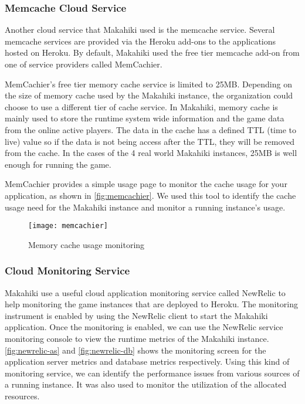 \subsubsection{Memcache Cloud Service}

Another cloud service that Makahiki used is the memcache service. Several memcache services are provided via the Heroku add-ons to the applications hosted on Heroku. By default, Makahiki used the free tier memcache add-on from one of service providers called MemCachier\cite{memcachier}. 

MemCachier's free tier memory cache service is limited to 25MB. Depending on the size of memory cache used by the Makahiki instance, the organization could choose to use a different tier of cache service. In Makahiki, memory cache is mainly used to store the runtime system wide information and the game data from the online active players. The data in the cache has a defined TTL (time to live) value so if the data is not being access after the TTL, they will be removed from the cache. In the cases of the 4 real world Makahiki instances, 25MB is well enough for running the game.

MemCachier provides a simple usage page to monitor the cache usage for your application, as shown in \autoref{fig:memcachier}. We used this tool to identify the cache usage need for the Makahiki instance and monitor a running instance's usage.

\begin{figure}[ht!]
  \center
  \texttt{[image: memcachier]}
  \caption{Memory cache usage monitoring}
  \label{fig:memcachier}
\end{figure}

\subsubsection{Cloud Monitoring Service}

Makahiki use a useful cloud application monitoring service called NewRelic to help monitoring the game instances that are deployed to Heroku. The monitoring instrument is enabled by using the NewRelic client to start the Makahiki application. Once the monitoring is enabled, we can use the NewRelic service monitoring console to view the runtime metrics of the Makahiki instance. \autoref{fig:newrelic-as} and \autoref{fig:newrelic-db} shows the monitoring screen for the application server metrics and database metrics respectively. Using this kind of monitoring service, we can identify the performance issues from various sources of a running instance. It was also used to monitor the utilization of the allocated resources.

